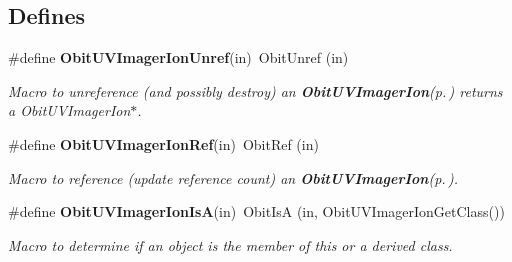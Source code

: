 \subsection*{Defines}
\begin{CompactItemize}
\item 
\#define {\bf Obit\-UVImager\-Ion\-Unref}(in)\ Obit\-Unref (in)
\begin{CompactList}\small\item\em Macro to unreference (and possibly destroy) an {\bf Obit\-UVImager\-Ion}{\rm (p.\,\pageref{structObitUVImagerIon})} returns a Obit\-UVImager\-Ion$\ast$. \item\end{CompactList}\item 
\#define {\bf Obit\-UVImager\-Ion\-Ref}(in)\ Obit\-Ref (in)
\begin{CompactList}\small\item\em Macro to reference (update reference count) an {\bf Obit\-UVImager\-Ion}{\rm (p.\,\pageref{structObitUVImagerIon})}. \item\end{CompactList}\item 
\#define {\bf Obit\-UVImager\-Ion\-Is\-A}(in)\ Obit\-Is\-A (in, Obit\-UVImager\-Ion\-Get\-Class())
\begin{CompactList}\small\item\em Macro to determine if an object is the member of this or a derived class. \item\end{CompactList}\end{CompactItemize}
